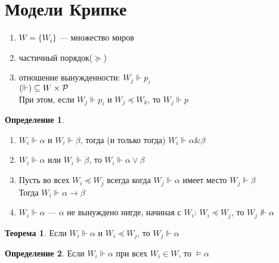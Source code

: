 \documentclass[english]{article}
\theoremstyle{plain}
\theoremstyle{remark}
\theoremstyle{definition}
\newtheorem{theorem}{Теорема}[section]
\newtheorem*{definition}{Определение}
\begin{document}
\section{Модели Крипке}
\label{sec:orgf2d3b60}
\begin{center}
\end{center}
\begin{defintion}
\-
\begin{enumerate}
\item \(W = \{W_i\}\) --- множество миров
\item частичный порядок(\(\succeq\))
\item отношение вынужденности: \(W_j \Vdash p_i\) \\
\((\Vdash)  \subseteq W \times \P\) \\
При этом, если \(W_j \Vdash p_i\) и \(W_j \preceq W_k\), то \(W_j \Vdash p\)
\end{enumerate}
\end{defintion}
\begin{definition}
\-
\begin{enumerate}
\item \(W_i \Vdash \alpha\) и \(W_i \Vdash \beta\), тогда (и только тогда) \(W_i \Vdash \alpha \& \beta\) \\
\item \(W_i \Vdash \alpha\) или \(W_i \Vdash \beta\), то \(W_i \Vdash \alpha \vee \beta\)
\item Пусть во всех \(W_i \preceq W_j\) всегда когда \(W_j \Vdash \alpha\) имеет место \(W_j \Vdash \beta\) \\
Тогда \(W_i \Vdash \alpha \to \beta\)
\item \(W_i \Vdash \alpha\) --- \(\alpha\) не вынуждено нигде, начиная с \(W_i\):
\(W_i \preceq W_j\), то \(W_j \not\Vdash \alpha\)
\end{enumerate}
\end{definition}
\begin{theorem}
Если \(W_i \Vdash \alpha\) и \(W_i \preceq W_j\), то \(W_j \Vdash \alpha\)
\end{theorem}
\begin{definition}
Если \(W_i \Vdash \alpha\) при всех \(W_i \in W\), то \(\vDash \alpha\)
\end{definition}
\end{document}
